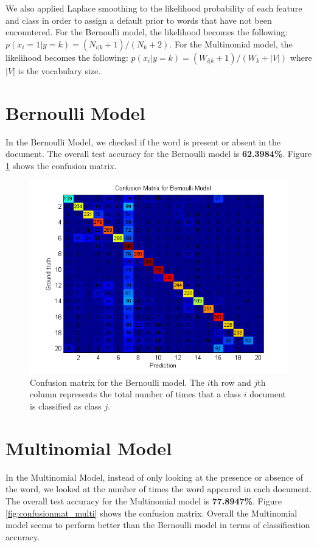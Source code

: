\documentclass[12pt]{article}
\begin{document}
We also applied Laplace smoothing to the likelihood probability of each feature and class in order to assign a default prior to words that have not been encountered. For the Bernoulli model, the likelihood becomes the following: \(p(x_i = 1 | y = k) = (N_{i|k}+1)/(N_k + 2)\). For the Multinomial model, the likelihood becomes the following: \(p(x_i | y = k) = (W_{i|k}+1)/(W_k + |V|)\) where \(|V|\) is the vocabulary size.

\section{Bernoulli Model}

In the Bernoulli Model, we checked if the word is present or absent in the document. The overall test accuracy for the Bernoulli model is \textbf{62.3984\%}. Figure \ref{fig:confusionmat_bern} shows the confusion matrix.

\begin{figure}[!t]
  \centering
  \includegraphics[scale=1]{img/confusionmat_bern.png}
  \caption{Confusion matrix for the Bernoulli model. The \(i\)th row and \(j\)th column represents the total number of times that a class \(i\) document is classified as class \(j\).}
  \label{fig:confusionmat_bern}
\end{figure}

\section{Multinomial Model}

In the Multinomial Model, instead of only looking at the presence or absence of the word, we looked at the number of times the word appeared in each document. The overall test accuracy for the Multinomial model is \textbf{77.8947\%}. Figure \ref{fig:confusionmat_multi} shows the confusion matrix. Overall the Multinomial model seems to perform better than the Bernoulli model in terms of classification accuracy.
\end{document}

